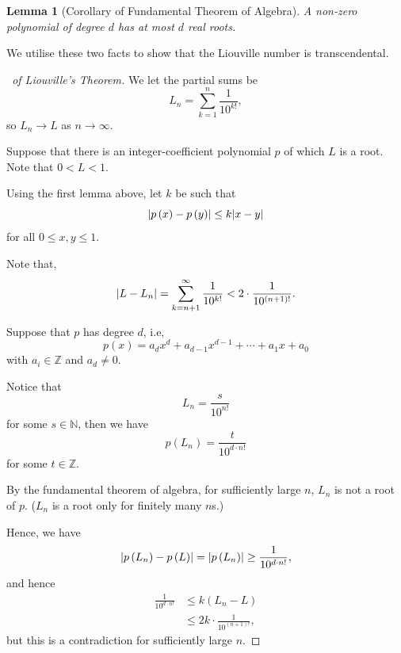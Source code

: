 \documentclass{article}
\newtheorem{lemma}[theorem]{Lemma}
\theoremstyle{definition}
\theoremstyle{remark}
\DeclarePairedDelimiter{\abs}{\lvert}{\rvert}
\newcommand{\pqty}[1]{\left(#1\right)}
\newcommand{\NN}{\mathbb{N}}
\newcommand{\ZZ}{\mathbb{Z}}
\begin{document}
\begin{lemma}[Corollary of Fundamental Theorem of Algebra]
    A non-zero polynomial of degree \(d\) has at most \(d\) real roots.
\end{lemma}

We utilise these two facts to show that the Liouville number is transcendental.

\begin{proof}[\proofname\ of Liouville's Theorem]
    We let the partial sums be
    \[
        L_n = \sum_{k = 1}^{n} \frac{1}{10^{k!}},
    \]
    so \(L_n \to L\) as \(n \to \infty\).

    Suppose that there is an integer-coefficient polynomial \(p\) of which \(L\) is a root. Note that \(0 < L < 1\).

    Using the first lemma above, let \(k\) be such that
    \[
        \abs{p \pqty{x} - p \pqty{y}} \leq k \abs{x - y}
    \]
    for all \(0 \leq x, y \leq 1\).

    Note that,
    \[
        \abs{L - L_n} = \sum_{k = n + 1}^{\infty} \frac{1}{10^{k!}} < 2 \cdot \frac{1}{10^{\pqty{n + 1}!}}.
    \]

    Suppose that \(p\) has degree \(d\), i.e,
    \[
        p\pqty{x} = a_d x^d + a_{d - 1} x^{d - 1} + \cdots + a_1 x + a_0
    \]
    with \(a_i \in \ZZ\) and \(a_d \neq 0\).

    Notice that
    \[
        L_n = \frac{s}{10^{n!}}
    \]
    for some \(s \in \NN\), then we have
    \[
        p \pqty{L_n} = \frac{t}{10^{d \cdot n!}}
    \]
    for some \(t \in \ZZ\).

    By the fundamental theorem of algebra, for sufficiently large \(n\), \(L_n\) is not a root of \(p\). (\(L_n\) is a root only for finitely many \(n\)s.)

    Hence, we have
    \[
        \abs{p\pqty{L_n} - p\pqty{L}} = \abs{p\pqty{L_n}} \geq \frac{1}{10^{d \cdot n!}},
    \]
    and hence
    \begin{align*}
        \frac{1}{10^{d \cdot n!}} &\leq k \pqty{L_n - L} \\
        &\leq 2k \cdot \frac{1}{10^{\pqty{n + 1}!}},
    \end{align*}
    but this is a contradiction for sufficiently large \(n\).
\end{proof}
\end{document}
